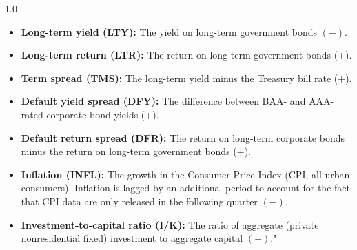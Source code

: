 \documentclass[a4paper,11pt]{article}
\begin{document}
\begin{spacing}{1.0}
\begin{itemize}[noitemsep, topsep=0pt]
\item \textbf{Long-term yield (LTY):} The yield on long-term government bonds $(-)$.

\item \textbf{Long-term return (LTR):} The return on long-term government bonds (+).

\item \textbf{Term spread (TMS):} The long-term yield minus the Treasury bill rate (+).

\item \textbf{Default yield spread (DFY):} The difference between BAA- and AAA-rated corporate bond yields (+).

\item \textbf{Default return spread (DFR):} The return on long-term corporate bonds minus the return on long-term government bonds (+).

\item \textbf{Inflation (INFL):} The growth in the Consumer Price Index (CPI, all urban consumers). Inflation is lagged by an additional period to account for the fact that CPI data are only released in the following quarter $(-)$.

\item \textbf{Investment-to-capital ratio (I/K):} The ratio of aggregate (private nonresidential fixed) investment to aggregate capital $(-)$."
\end{itemize}
\end{spacing}
\end{document}
